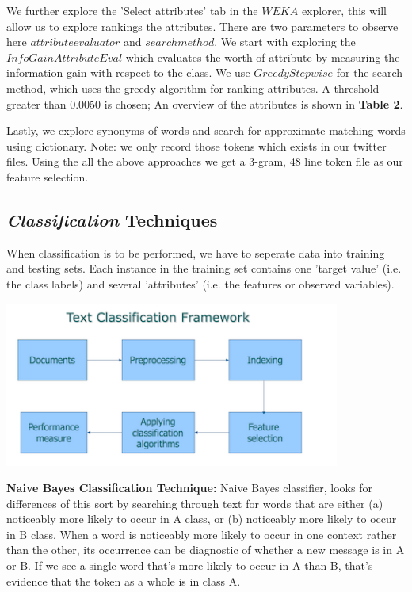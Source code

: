 We further explore the 'Select attributes' tab in the $WEKA$ explorer, this will allow us to explore rankings the attributes. There are two parameters to observe here $attribute evaluator$ and $search method$. We start with exploring the $InfoGainAttributeEval$ which evaluates the worth of attribute by measuring the information gain with respect to the class. We use $GreedyStepwise$ for the search method, which uses the greedy algorithm for ranking attributes. A threshold greater than 0.0050 is chosen; An overview of the attributes is shown in \textbf {Table 2}.  

Lastly, we explore synonyms of words and search for approximate matching words using dictionary. Note: we only record those tokens which exists in our twitter files. Using the all the above approaches we get a 3-gram, 48 line token file as our feature selection. 

\begin{table}[t]
\centering

\aftertabspace
\end{table}

 
\subsection{{\itshape Classification} Techniques}
  
 When classification is to be performed, we have to seperate data into training and testing sets. Each instance in the training set contains one 'target value' (i.e. the class labels) and several 'attributes' (i.e. the features or observed variables). 
 
 \includegraphics {finalgraph8.pdf}
  
\textbf{Naive Bayes Classification Technique:} Naive Bayes classifier, looks for differences of this sort by searching through text for words that are either (a) noticeably more likely to occur in A class, or (b) noticeably more likely to occur in B class. When a word is noticeably more likely to occur in one context rather than the other, its occurrence can be diagnostic of whether a new message is in A or B. If we see a single word that's more likely to occur in A than B, that's evidence that the token as a whole is in class A. 

